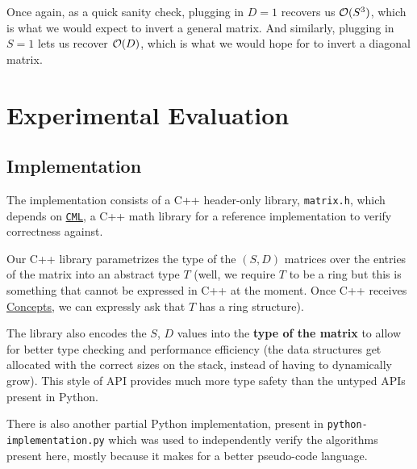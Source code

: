 \documentclass[11pt]{article}
\begin{document}
Once again, as a quick sanity check, plugging in $D = 1$ recovers us $\mathcal{O}(S^3)$, which
is what we would expect to invert a general matrix. And similarly, plugging in
$S = 1$ lets us recover $\mathcal{O}(D)$, which is what we would hope for to invert
a diagonal matrix.

\section{Experimental Evaluation}
\subsection{Implementation}
The implementation consists of a C++ header-only library, \texttt{matrix.h},
which depends on \href{https://github.com/MichaelJWelsh/cml}{\texttt{CML}},
a C++ math library for a reference implementation to verify correctness against.

Our C++ library parametrizes the type of the $(S, D)$ matrices over
the entries of the matrix into an abstract type $T$ (well, we require $T$ to
be a ring but this is something that cannot be expressed in C++ at the moment.
Once C++ receives \href{https://github.com/MichaelJWelsh/cml}{Concepts},
we can expressly ask that $T$ has a ring structure).

The library also encodes the $S$, $D$ values into the \textbf{type of the matrix}
to allow for better type checking and performance efficiency
(the data structures get allocated with the correct sizes on the
stack, instead of having to dynamically grow). This style of API provides
much more type safety than the untyped APIs present in Python.

There is also another partial Python implementation, present in
\texttt{python-implementation.py} which was used to independently verify
the algorithms present here, mostly because it makes for a better pseudo-code
language.
\end{document}

